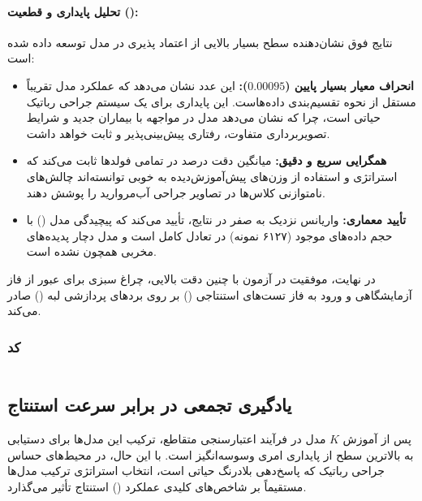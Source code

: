 \documentclass{article}
\begin{document}
\paragraph{تحلیل پایداری و قطعیت ():}
نتایج فوق نشان‌دهنده سطح بسیار بالایی از اعتماد پذیری در مدل توسعه داده شده است:
\begin{itemize}
	\item \textbf{انحراف معیار بسیار پایین ($0.00095$):} این عدد نشان می‌دهد که عملکرد مدل تقریباً مستقل از نحوه تقسیم‌بندی داده‌هاست. این پایداری برای یک سیستم جراحی رباتیک حیاتی است، چرا که نشان می‌دهد مدل در مواجهه با بیماران جدید و شرایط تصویربرداری متفاوت، رفتاری پیش‌بینی‌پذیر و ثابت خواهد داشت.
	\item \textbf{همگرایی سریع و دقیق:} میانگین دقت  درصد در تمامی فولدها ثابت می‌کند که استراتژی  و استفاده از وزن‌های پیش‌آموزش‌دیده  به خوبی توانسته‌اند چالش‌های نامتوازنی کلاس‌ها در تصاویر جراحی آب‌مروارید را پوشش دهند.
	\item \textbf{تأیید معماری:} واریانس نزدیک به صفر در نتایج، تأیید می‌کند که پیچیدگی مدل () با حجم داده‌های موجود (۶۱۲۷ نمونه) در تعادل کامل است و مدل دچار پدیده‌های مخربی همچون  نشده است.
\end{itemize}

در نهایت، موفقیت در آزمون  با چنین دقت بالایی، چراغ سبزی برای عبور از فاز آزمایشگاهی و ورود به فاز تست‌های استنتاجی () بر روی بردهای پردازشی لبه () صادر می‌کند.
\subsubsection{کد}
\begin{LTR}
	\inputminted{python}{code/rc_hw3_q3.py}
\end{LTR}


\subsection{یادگیری تجمعی  در برابر سرعت استنتاج}

پس از آموزش $K$ مدل در فرآیند اعتبارسنجی متقاطع، ترکیب این مدل‌ها برای دستیابی به بالاترین سطح از پایداری امری وسوسه‌انگیز است. با این حال، در محیط‌های حساس جراحی رباتیک که پاسخ‌دهی بلادرنگ حیاتی است، انتخاب استراتژی ترکیب مدل‌ها مستقیماً بر شاخص‌های کلیدی عملکرد () استنتاج تأثیر می‌گذارد.
\end{document}
